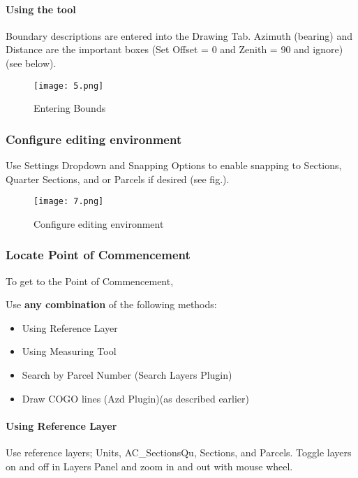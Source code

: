 \documentclass[class=book , crop=false]{standalone}
\begin{document}
		\paragraph{Using the tool}
			\large Boundary descriptions are entered into the Drawing Tab. Azimuth (bearing) and Distance are the important boxes (Set Offset = 0 and Zenith = 90 and ignore)(see below).
			\begin{figure}[H]
			\begin{center}
			\texttt{[image: 5.png]}
			\end{center}
			\caption{Entering Bounds}
			\end{figure}

\clearpage

	\subsubsection{Configure editing environment}
	\Large Use Settings Dropdown and Snapping Options to enable snapping to Sections, Quarter Sections, and or Parcels if desired (see fig.).

		\begin{figure}[H]
		\begin{center}
		\texttt{[image: 7.png]}
		\end{center}
		\caption{Configure editing environment}
		\end{figure}

\clearpage

	\subsubsection{\Large Locate Point of Commencement}
		To get to the Point of Commencement,
		\medskip

		Use \textbf{any combination} of the following methods:
		\begin{itemize}
		\item{Using Reference Layer}
		\item{Using Measuring Tool}
		\item{Search by Parcel Number \small(Search Layers Plugin)}
		\item{Draw COGO lines \small(Azd Plugin)}\small(as described earlier)
		\end{itemize}

		\paragraph{Using Reference Layer}
			\large Use reference layers; Units, AC\_SectionsQu, Sections, and Parcels.  Toggle layers on and off in Layers Panel and zoom in and out with mouse wheel.
			
\end{document}
